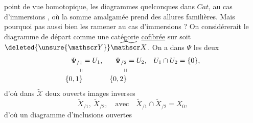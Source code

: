 point de vue homotopique, les diagrammes quelconques
dans $\mathit{Cat}$, au cas  d'immersions , où la somme amalgamée prend des allures familières. Mais pourquoi pas aussi bien les ramener au cas d'immersions  ? On considérerait  le diagramme de départ comme  une catégorie \uline{cofibrée} sur
soit $\deleted{\unsure{\mathscr Y}}\widetilde{\mathscr X}$. On a dans $\Psi$ les deux 
\[
\begin{aligned}
\Psi_{/1}&=U_1,&\Psi_{/2}&=U_2,&U_1\cap U_2&=\{0\},\\[-2pt]
\shortparallel&&\shortparallel\\[-2pt]
\{0,1\}&&\{0,2\}
\end{aligned}
\]
d'où dans $\widetilde{\mathscr X}$ deux ouverts images inverses
\[
\widetilde X_{/1},\ \widetilde X_{/2},\quad\text{avec}\quad \widetilde X_{/1}\cap\widetilde X_{/2}=X_0 ,
\]
d'où un diagramme  d'inclusions ouvertes
